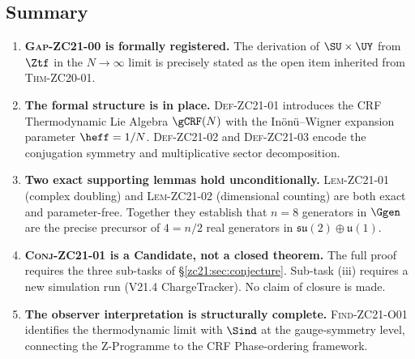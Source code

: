 \documentclass[12pt, a4paper]{article}
\begin{document}
\subsection{Summary}
\label{zc21:sec:summary}

\begin{enumerate}[leftmargin=*, label=\arabic*., noitemsep]

\item \textbf{\textsc{Gap-ZC21-00} is formally registered.}
  The derivation of $\SU\times\UY$ from $\Ztf$ in the $N\to\infty$ limit
  is precisely stated as the open item inherited from \textsc{Thm-ZC20-01}.

\item \textbf{The formal structure is in place.}
  \textsc{Def-ZC21-01} introduces the CRF Thermodynamic Lie Algebra
  $\gCRF(N)$ with the Inönü--Wigner expansion parameter $\heff = 1/N$.
  \textsc{Def-ZC21-02} and \textsc{Def-ZC21-03} encode the conjugation
  symmetry and multiplicative sector decomposition.

\item \textbf{Two exact supporting lemmas hold unconditionally.}
  \textsc{Lem-ZC21-01} (complex doubling) and
  \textsc{Lem-ZC21-02} (dimensional counting)
  are both exact and parameter-free.
  Together they establish that $n = 8$ generators in $\Ggen$
  are the precise precursor of $4 = n/2$ real generators
  in $\mathfrak{su}(2)\oplus\mathfrak{u}(1)$.

\item \textbf{\textsc{Conj-ZC21-01} is a Candidate, not a closed theorem.}
  The full proof requires the three sub-tasks of §\ref{zc21:sec:conjecture}.
  Sub-task (iii) requires a new simulation run (V21.4 ChargeTracker).
  No claim of closure is made.

\item \textbf{The observer interpretation is structurally complete.}
  \textsc{Find-ZC21-O01} identifies the thermodynamic limit with
  $\Sind$ at the gauge-symmetry level,
  connecting the Z-Programme to the CRF Phase-ordering framework.

\end{enumerate}

\bigskip
\end{document}
